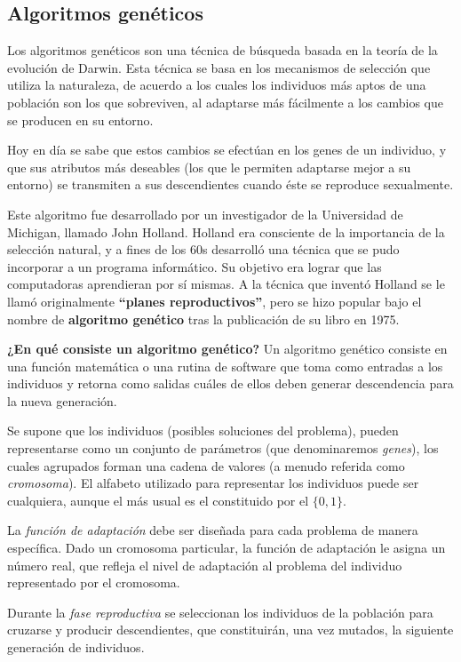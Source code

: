 \documentclass[a4paper, 11pt]{article} %
\begin{document}
\subsection{Algoritmos genéticos}
Los algoritmos genéticos son una técnica de búsqueda basada en la teoría de la evolución de Darwin. Esta técnica se basa en los mecanismos de selección que utiliza la naturaleza, de acuerdo a los cuales los individuos más aptos de una población son los que sobreviven, al adaptarse más fácilmente a los cambios que se producen en su entorno.

Hoy en día se sabe que estos cambios se efectúan en los genes de un individuo, y que sus atributos más deseables (los que le permiten adaptarse mejor a su entorno) se transmiten a sus descendientes cuando éste se reproduce sexualmente.

Este algoritmo fue desarrollado por un investigador de la Universidad de Michigan, llamado John Holland. Holland era consciente de la importancia de la selección natural, y a fines de los 60s desarrolló una técnica que se pudo incorporar a un programa informático. Su objetivo era lograr que las computadoras aprendieran por sí mismas. A la técnica que inventó Holland se le llamó originalmente \textbf{``planes reproductivos''}, pero se hizo popular bajo el nombre de \textbf{algoritmo genético} tras la publicación de su libro en 1975.

\textbf{¿En qué consiste un algoritmo genético?} Un algoritmo genético consiste en una función matemática o una rutina de software que toma como entradas a los individuos y retorna como salidas cuáles de ellos deben generar descendencia para la nueva generación.

Se supone que los individuos (posibles soluciones del problema), pueden representarse como un conjunto de parámetros (que denominaremos \textit{genes}), los cuales agrupados forman una cadena de valores (a menudo referida como \textit{cromosoma}). El alfabeto utilizado para representar los individuos puede ser cualquiera, aunque el más usual es el constituido por el $\{0, 1\}$.

La \textit{función de adaptación} debe ser diseñada para cada problema de manera específica. Dado un
cromosoma particular, la función de adaptación le asigna un número real, que refleja el
nivel de adaptación al problema del individuo representado por el cromosoma.

Durante la \textit{fase reproductiva} se seleccionan los individuos de la población para cruzarse y producir descendientes, que constituirán, una vez mutados, la siguiente generación de individuos.
\end{document}
